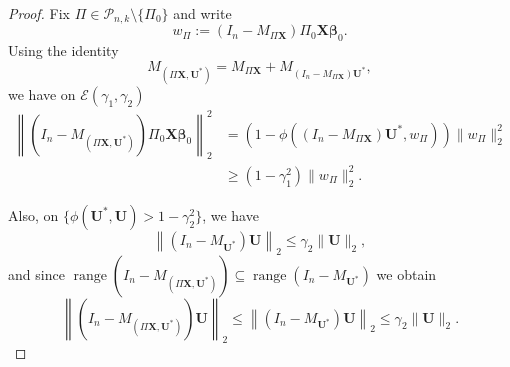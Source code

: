 \documentclass[11pt, reqno]{amsart}
\renewcommand{\le}{\leqslant}
\renewcommand{\ge}{\geqslant}
\newcommand{\mP}{\mathcal{P}}
\newcommand{\1}{\mbox{1}\hspace{-0.25em}\mbox{l}}
\DeclareMathOperator{\range}{range}
\theoremstyle{definition}\newtheorem{problem}{Problem}[section]
\theoremstyle{definition}\newtheorem{definition}[problem]{Definition}
\theoremstyle{remark}\newtheorem{assumption}{Assumption}
\theoremstyle{remark}\newtheorem{remark}[problem]{Remark}
\theoremstyle{definition}\newtheorem{example}[problem]{Example}
\theoremstyle{plain}\newtheorem{theorem}[problem]{Theorem}
\theoremstyle{plain}\newtheorem{question}[problem]{Question}
\theoremstyle{plain}\newtheorem{lemma}[problem]{Lemma}
\theoremstyle{plain}\newtheorem{proposition}[problem]{Proposition}
\theoremstyle{plain}\newtheorem{corollary}[problem]{Corollary}
\theoremstyle{plain}\newtheorem{conjecture}[problem]{Conjecture}
\begin{document}
\begin{proof}
Fix $\Pi\in\mP_{n,k}\setminus\{\Pi_0\}$ and write
\[
w_\Pi:=\left(I_n-M_{\Pi\bm X}\right)\Pi_0\bm X\bm\beta_0.
\]
Using the identity
\[
M_{(\Pi\bm X,\bm U^*)}
=
M_{\Pi\bm X}+M_{(I_n-M_{\Pi\bm X})\bm U^*},
\]
we have on $\mathcal E(\gamma_1,\gamma_2)$
\begin{align*}
\left\|\left(I_n-M_{(\Pi\bm X,\bm U^*)}\right)\Pi_0\bm X\bm\beta_0\right\|_2^2
&=
\left(1-\phi\left((I_n-M_{\Pi\bm X})\bm U^*,w_\Pi\right)\right)\|w_\Pi\|_2^2\\
&\ge (1-\gamma_1^2)\|w_\Pi\|_2^2.
\end{align*}

Also, on $\{\phi(\bm U^*,\bm U)>1-\gamma_2^2\}$, we have
\[
\left\|\left(I_n-M_{\bm U^*}\right)\bm U\right\|_2\le \gamma_2\|\bm U\|_2,
\]
and since $\range\left(I_n-M_{(\Pi\bm X,\bm U^*)}\right)\subseteq \range\left(I_n-M_{\bm U^*}\right)$ we obtain
\[
\left\|\left(I_n-M_{(\Pi\bm X,\bm U^*)}\right)\bm U\right\|_2
\le
\left\|\left(I_n-M_{\bm U^*}\right)\bm U\right\|_2
\le \gamma_2\|\bm U\|_2.
\]


\end{proof}
\end{document}
